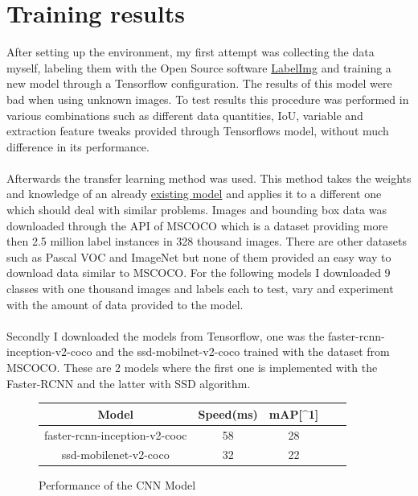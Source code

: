 \section{Training results}
After setting up the environment, my first attempt was collecting the data myself, labeling them with the Open Source software
\href{https://github.com/tzutalin/labelImg}{LabelImg} and training a new model through a Tensorflow configuration. The results of
this model were bad when using unknown images. To test results this procedure was performed in various combinations such as different data quantities, IoU, variable and extraction
feature tweaks provided through Tensorflows model, without much difference in its performance.\\ \\
Afterwards the transfer learning method was used. This method takes the weights and knowledge of an already
\href{https://github.com/tensorflow/models/blob/master/research/object_detection/g3doc/detection_model_zoo.md}{existing model} and applies
it to a different one which should deal with similar problems. 
Images and bounding box data was downloaded through the API of MSCOCO which is a dataset providing more then 2.5 million label
instances in 328 thousand images.\cite{mscoco} There are other datasets such as Pascal VOC and ImageNet but none of them provided an easy way to
download data similar to MSCOCO. For the following models I downloaded 9 classes with one thousand images and labels each to test, vary and experiment
with the amount of data provided to the model.\\\\
Secondly I downloaded the models from Tensorflow, one was the faster-rcnn-inception-v2-coco and the ssd-mobilnet-v2-coco trained with the
dataset from MSCOCO. These are 2 models where the first one is implemented with the Faster-RCNN and the latter with SSD algorithm. \\
\vspace{0.25cm}
\begin{figure}[H]
    \begin{center}
        \begin{tabular}{|c|c|c|c|c|}
            \hline
            Model & Speed(ms) &  mAP[{\textasciicircum}1] \\ \hline
            faster-rcnn-inception-v2-cooc & 58 & 28 \\ \hline
            ssd-mobilenet-v2-coco & 32 & 22 \\ \hline
        \end{tabular}
    \end{center}
    \caption{Performance of the CNN Model}
\end{figure}
